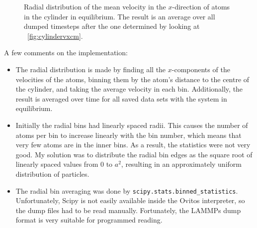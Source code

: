 \documentclass[11pt,british,a4paper]{report}
\begin{document}
\begin{figure}[H]
    \centering
    \caption{Radial distribution of the mean velocity in the \(x\)-direction of atoms in the cylinder in equilibrium. The result is an average over all dumped timesteps after the one determined by looking at ~\vref{fig:cylindervxcm}.}%
    \label{fig:cylindervx}
\end{figure}
A few comments on the implementation:
\begin{itemize}
    \item The radial distribution is made by finding all the \(x\)-components of the velocities of the atoms, binning them by the atom's distance to the centre of the cylinder, and taking the average velocity in each bin. Additionally, the result is averaged over time for all saved data sets with the system in equilibrium.
    \item Initially the radial bins had linearly spaced radii. This causes the number of atoms per bin to increase linearly with the bin number, which means that very few atoms are in the inner bins. As a result, the statistics were not very good. My solution was to distribute the radial bin edges as the square root of linearly spaced values from \(0\) to \(a^2\), resulting in an approximately uniform distribution of particles.
    \item The radial bin averaging was done by \lstinline{scipy.stats.binned_statistics}. Unfortunately, Scipy is not easily available inside the Ovitos interpreter, so the dump files had to be read manually. Fortunately, the LAMMPs dump format is very suitable for programmed reading.
\end{itemize}
\end{document}
